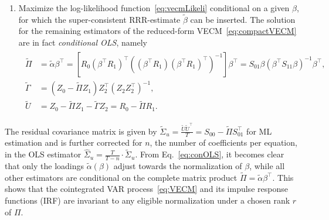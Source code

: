\begin{enumerate}[label=\textbf{\arabic*.}]
	\item Maximize the log-likelihood function~\eqref{eq:vecmLikeli} conditional on a given $ \beta $, for which the super-consistent RRR-estimate $ \widetilde{\beta} $ can be inserted. The solution for the remaining estimators of the reduced-form VECM~\eqref{eq:compactVECM} are in fact \textit{conditional OLS}, namely
	\begin{align} \label{eq:conOLS}
	\begin{split}
		\widetilde{\Pi} & = \widetilde{\alpha} \beta^\top = \left[ R^{\ }_0 \left( \beta^\top R^{\ }_1 \right)^\top \left( \left( \beta^\top R^{\ }_1 \right) \left( \beta^\top R^{\ }_1 \right)^\top \right)^{-1} \right] \beta^\top = S_{01} \beta \left( \beta^\top S_{11} \beta \right)^{-1} \beta^\top, \\
		\widetilde{\Gamma} & = \left( Z^{\ }_0 - \widetilde{\Pi} Z^{\ }_1 \right) Z_2^\top ( Z^{\ }_2 Z_2^\top )^{-1}, \\
		\widetilde{U} & = Z^{\ }_0 - \widetilde{\Pi} Z^{\ }_1 - \widetilde{\Gamma} Z^{\ }_2 = R^{\ }_0 - \widetilde{\Pi} R^{\ }_1.
	\end{split}
	\end{align}
\end{enumerate}
The residual covariance matrix is given by $ \widetilde{\Sigma}_u = \frac{\widetilde{U} \widetilde{U}^\top}{T} = S_{00} - \widetilde{\Pi} S_{01}^\top $ for ML estimation and is further corrected for $ n $, the number of coefficients per equation, in the OLS estimator $ \widehat{\Sigma}_u = \frac{T}{T-n} \cdot \widetilde{\Sigma}_u $. From Eq.~\eqref{eq:conOLS}, it becomes clear that only the loadings $ \widetilde{\alpha}(\beta) $ adjust towards the normalization of $ \beta $, while all other estimators are conditional on the complete matrix product $ \widetilde{\Pi} = \widetilde{\alpha} \beta^\top $. This shows that the cointegrated VAR process~\eqref{eq:VECM} and its impulse response functions (IRF) are invariant to any eligible normalization under a chosen rank $ r $ of $ \Pi $.



